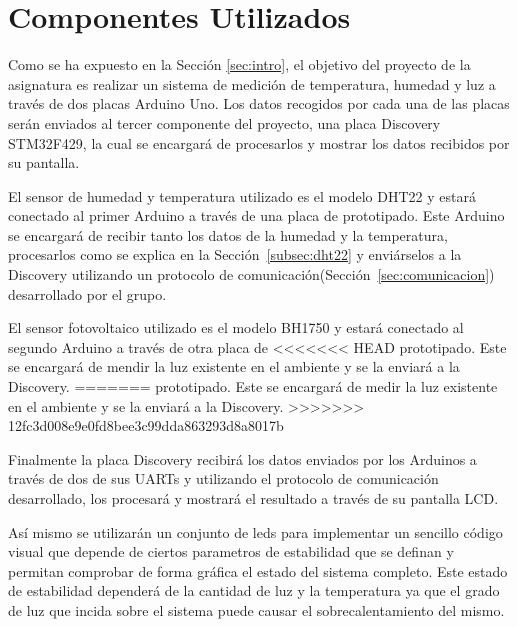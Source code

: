 \section{Componentes Utilizados}\label{sec:arquitectura}

Como se ha expuesto en la Secci\'on \ref{sec:intro}, el objetivo del
proyecto de la asignatura es realizar un sistema de medici\'on de
temperatura, humedad y luz a trav\'es de dos placas Arduino Uno. Los
datos recogidos por cada una de las placas ser\'an enviados al tercer
componente del proyecto, una placa Discovery STM32F429, la cual se
encargar\'a de procesarlos y mostrar los datos recibidos por su
pantalla.

El sensor de humedad y temperatura utilizado es el modelo DHT22 y
estar\'a conectado al primer Arduino a trav\'es de una placa de
prototipado. Este Arduino se encargar\'a de recibir tanto los datos de
la humedad y la temperatura, procesarlos como se explica en la
Secci\'on~\ref{subsec:dht22} y envi\'arselos a la Discovery utilizando
un protocolo de comunicaci\'on(Secci\'on~\ref{sec:comunicacion}) desarrollado por el grupo.

El sensor fotovoltaico utilizado es el modelo BH1750 y estar\'a
conectado al segundo Arduino a trav\'es de otra placa de
<<<<<<< HEAD
prototipado. Este se encargar\'a de mendir la luz existente en el
ambiente y se la enviar\'a a la Discovery.
=======
prototipado. Este se encargar\'a de medir la luz existente en el
ambiente y se la enviar\'a a la Discovery. %
>>>>>>> 12fc3d008e9e0fd8bee3c99dda863293d8a8017b

Finalmente la placa Discovery recibir\'a los datos enviados por los
Arduinos a trav\'es de dos de sus UARTs y utilizando el protocolo de
comunicaci\'on desarrollado, los procesar\'a y mostrar\'a el resultado
a trav\'es de su pantalla LCD.

As\'i mismo se utilizar\'an un conjunto de leds para implementar un
sencillo c\'odigo visual que depende de ciertos parametros de
estabilidad que se definan y permitan comprobar de forma gr\'afica el
estado del sistema completo. Este estado de estabilidad depender\'a de
la cantidad de luz y la temperatura ya que el grado de luz que incida
sobre el sistema puede causar el sobrecalentamiento del mismo.

